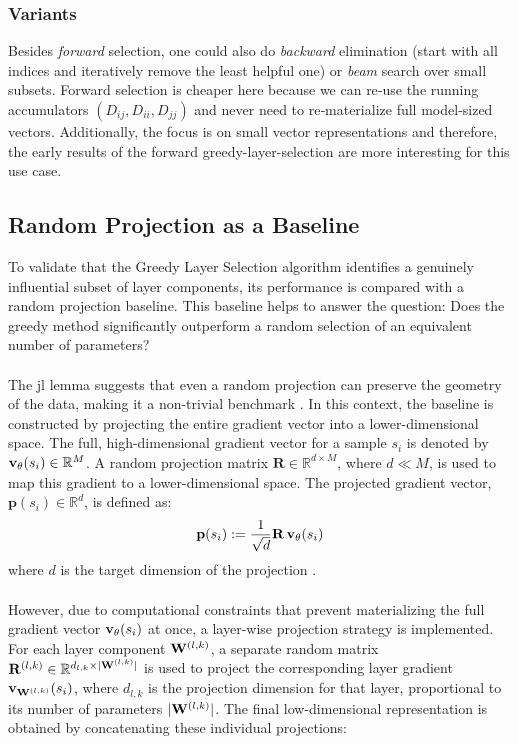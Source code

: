 \subsubsection{Variants}
Besides \emph{forward} selection, one could also do \emph{backward} elimination (start with all indices and iteratively remove the least helpful one) or \emph{beam} search over small subsets. Forward selection is cheaper here because we can re‑use the running accumulators $(D_{ij},D_{ii},D_{jj})$ and never need to re‑materialize full model‑sized vectors. Additionally, the focus is on small vector representations and therefore, the early results of the forward greedy-layer-selection are more interesting for this use case.

\subsection{Random Projection as a Baseline}\label{subsec:random_projection_as_a_baseline}
To validate that the Greedy Layer Selection algorithm identifies a genuinely influential subset of layer components, its performance is compared with a random projection baseline. This baseline helps to answer the question: Does the greedy method significantly outperform a random selection of an equivalent number of parameters?
\\\\
The \acrfull{jl} lemma suggests that even a random projection can preserve the geometry of the data, making it a non-trivial benchmark \cite{johnson_lindenstrauss}. In this context, the baseline is constructed by projecting the entire gradient vector into a lower-dimensional space. The full, high-dimensional gradient vector for a sample $s_i$ is denoted by $\vXsi[\theta] \in \mathbb{R}^M$. A random projection matrix $\mathbf{R} \in \mathbb{R}^{d \times M}$, where $d \ll M$, is used to map this gradient to a lower-dimensional space. The projected gradient vector, $\mathbf{p}(s_i) \in \mathbb{R}^d$, is defined as:
\begin{equation}
    \mathbf{p}(s_i) := \frac{1}{\sqrt{d}} \mathbf{R} \, \vXsi[\theta]
\end{equation}
where $d$ is the target dimension of the projection \cite{rakhshan2022rademacherrandomprojectionstensor}.
\\\\
However, due to computational constraints that prevent materializing the full gradient vector $\vXsi[\theta]$ at once, a layer-wise projection strategy is implemented. For each layer component $\Wlk$, a separate random matrix $\mathbf{R}^{(l,k)} \in \mathbb{R}^{d_{l,k} \times |\Wlk|}$ is used to project the corresponding layer gradient $\vXsi[\Wlk]$, where $d_{l,k}$ is the projection dimension for that layer, proportional to its number of parameters $|\Wlk|$. The final low-dimensional representation is obtained by concatenating these individual projections:
